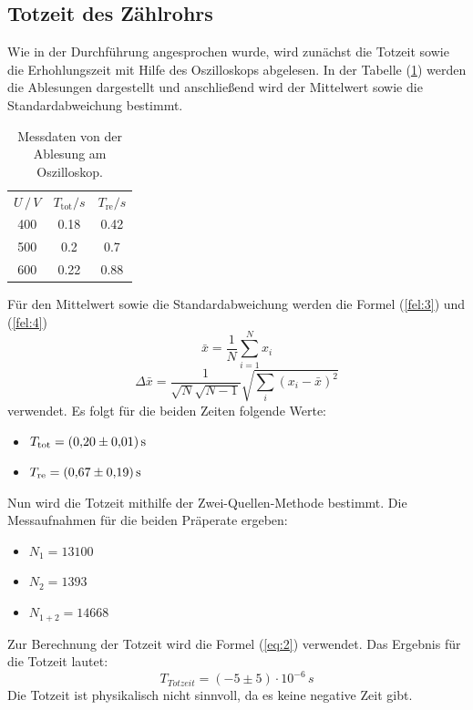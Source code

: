 \subsection{Totzeit des Zählrohrs}
Wie in der Durchführung angesprochen wurde, wird zunächst die Totzeit sowie die Erhohlungszeit mit Hilfe des Oszilloskops
abgelesen. In der Tabelle (\ref{tab:2}) werden die Ablesungen dargestellt und anschließend wird der Mittelwert sowie die Standardabweichung
bestimmt.
\begin{table}[H]
  \centering
  \caption{Messdaten von der Ablesung am Oszilloskop.}
  \label{tab:2}
  \begin{tabular}{c c c}
    \toprule
    $U \, /\, V$ & $T_\text{tot} / s$ & $T_\text{re} / s$\\
    400 & 0.18 & 0.42\\
    500 & 0.2 & 0.7\\
    600 & 0.22 & 0.88\\
    \bottomrule
  \end{tabular}
\end{table}
Für den Mittelwert sowie die Standardabweichung werden die Formel (\ref{fel:3}) und (\ref{fel:4})
\begin{equation}
    \bar{x} = \frac{1}{N} \sum_{i=1}^{N} x_i
    \label{fel:3}
\end{equation}
\begin{equation}
  \Delta \bar{x} = \frac{1}{\sqrt{N}\sqrt{N-1}} \sqrt{\sum_{i}(x_i-\bar{x})^2}
  \label{fel:4}
\end{equation}
verwendet. Es folgt für die beiden Zeiten folgende Werte:
\begin{itemize}
  \item $T_\text{tot} = \SI{0,2 \pm 0,01}{\second}$
  \item $T_\text{re} = \SI{0,67 \pm 0,19}{\second}$
\end{itemize}
Nun wird die Totzeit mithilfe der Zwei-Quellen-Methode bestimmt.
Die Messaufnahmen für die beiden Präperate ergeben:
\begin{itemize}
  \item $N_1 = 13100$
  \item $N_2 = 1393$
  \item $N_{1+2} = 14668$
\end{itemize}
Zur Berechnung der Totzeit wird die Formel (\ref{eq:2}) verwendet.
Das Ergebnis  für die Totzeit lautet:
\begin{equation*}
  T_{Totzeit} = (-5 \pm 5) \cdot 10^{-6} \, s
\end{equation*}
Die Totzeit ist physikalisch nicht sinnvoll, da es keine negative Zeit gibt.
